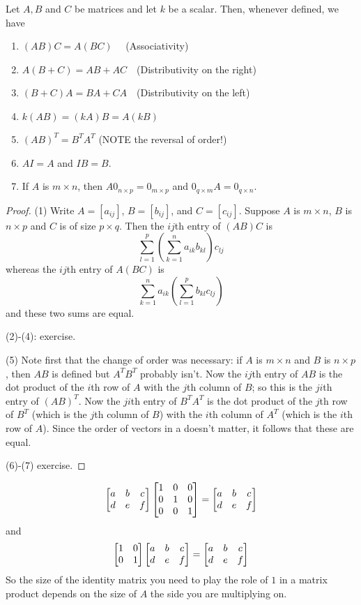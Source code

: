 \begin{theorem}
Let $A,B$ and $C$ be matrices and let $k$ be a scalar.  Then, whenever
defined, we have
\begin{enumerate}
\item $(AB)C = A(BC) \quad$ (Associativity)
\item $A(B+C) = AB + AC \quad$(Distributivity on the right)
\item $(B+C)A = BA + CA \quad$(Distributivity on the left)
\item $k(AB) = (kA)B = A(kB)$
\item $(AB)^T = B^TA^T$  (NOTE the reversal of order!)
\item $AI = A$ and $IB = B$.
\item If $A$ is $m\times n$, then $A0_{n\times p} = 0_{m\times p}$ and
$0_{q\times m}A = 0_{q\times n}$.  
\end{enumerate}
\end{theorem}

\begin{proof}
(1) Write $A = [a_{ij}]$, $B = [b_{ij}]$, and $C = [c_{ij}]$.  Suppose
$A$ is $m\times n$, $B$ is $n \times p$ and $C$ is of size $p \times q$.
Then the $ij$th entry of $(AB)C$ is
$$
\sum_{l=1}^p(\sum_{k=1}^n a_{ik}b_{kl})c_{lj}
$$
whereas the $ij$th entry of $A(BC)$ is
$$
\sum_{k=1}^n a_{ik}(\sum_{l=1}^pb_{kl}c_{lj})
$$
and these two sums are equal. 

(2)-(4): exercise.

(5) Note first that the change of order was necessary:  if $A$ is $m\times n$
and $B$ is $n\times p$, then $AB$ is defined but $A^TB^T$ probably isn't.
Now the $ij$th entry of $AB$ is the dot product of the $i$th row of $A$
with the $j$th column of $B$; so this is the $ji$th entry of $(AB)^T$.
Now the $ji$th entry of $B^TA^T$ is the dot product of the $j$th row of
$B^T$ (which is the $j$th column of $B$) with the $i$th column of $A^T$
(which is the $i$th row of $A$).  Since the order of vectors in a 
 doesn't matter, it follows that these are equal.

(6)-(7) exercise.
\end{proof}

\begin{myexample}
$$
\left[ \begin{matrix} a & b & c\\ d&e&f \end{matrix} \right]\left[ \begin{matrix} 1&0&0\\0&1&0\\0&0&1 \end{matrix} \right] = \left[ \begin{matrix} a & b & c\\ d&e&f \end{matrix} \right]
$$
and
$$
\left[ \begin{matrix} 1&0\\0&1 \end{matrix} \right]\left[ \begin{matrix} a & b & c\\ d&e&f \end{matrix} \right]=\left[ \begin{matrix} a & b & c\\ d&e&f \end{matrix} \right]
$$
So the size of the identity matrix you need to play the role of
$1$ in a matrix product depends on the size of $A$  the
side you are multiplying on.
\end{myexample}


